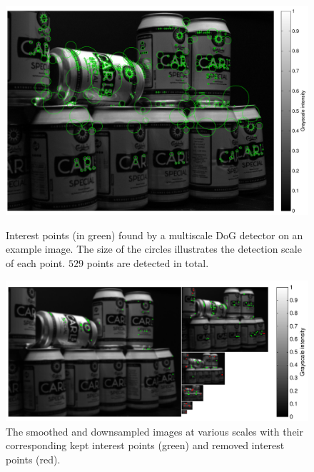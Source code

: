 \documentclass[thesis.tex]{subfiles}
\begin{document}
\begin{figure}[p]
    \centering
    \includegraphics[width=\textwidth]{img/cellHistDetector.pdf}
    \caption{Interest points (in green) found by a multiscale DoG detector on an example image. The size of the circles illustrates the detection scale of each point. $529$ points are detected in total.}
    \label{fig:cellHistDetector}
    \includegraphics[width=\textwidth]{img/cellHistScaleSpacesP.pdf}
    \caption{The smoothed and downsampled images at various scales with their corresponding kept interest points (green) and removed interest points (red).}
    \label{fig:cellHistScaleSpacesP}
\end{figure}
\end{document}
